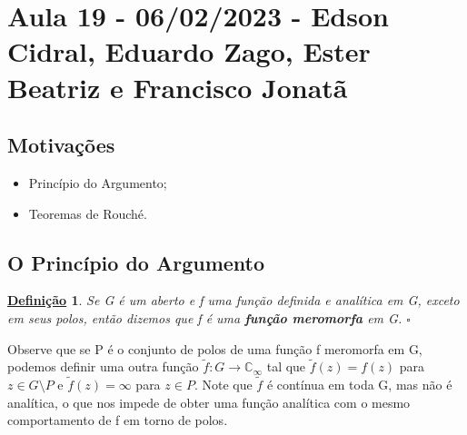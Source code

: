 \documentclass{article}
\newtheorem*{def*}{\underline{Defini\c c\~ao}}
\begin{document}
  \section{Aula 19 - 06/02/2023 - Edson Cidral, Eduardo Zago, Ester Beatriz e Francisco Jonatã}
  \subsection{Motivações}
  \begin{itemize}
    \item Princípio do Argumento;
    \item Teoremas de Rouché.
  \end{itemize}
  \subsection{O Princípio do Argumento}
  \begin{def*}
    Se G é um aberto e f uma função definida e analítica em G, exceto em seus polos, então dizemos que f é uma \textbf{função meromorfa} em G. \(\square\)
  \end{def*}
  Observe que se P é o conjunto de polos de uma função f meromorfa em G, podemos definir uma outra função \(\tilde{f}:G\rightarrow \mathbb{C}_{\infty}\) tal que
  \(\tilde{f}(z) = f(z)\) para \(z\in G\setminus{P}\) e \(\tilde{f}(z) = \infty\) para \(z\in P\). Note que \(\tilde{f}\) é contínua em toda G, mas não é analítica,
  o que nos impede de obter uma função analítica com o mesmo comportamento de f em torno de polos.
\end{document}

